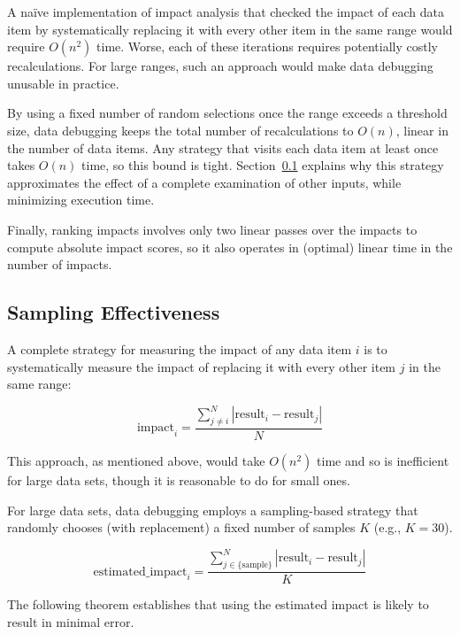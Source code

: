 A na\"ive implementation of impact analysis that checked the impact of
each data item by systematically replacing it with every other item in
the same range would require $O(n^2)$ time. Worse, each of these
iterations requires potentially costly recalculations. For large
ranges, such an approach would make data debugging unusable in
practice.
 
By using a fixed number of random selections once the range
exceeds a threshold size, data debugging keeps the total number of
recalculations to $O(n)$, linear in the number of data items. Any
strategy that visits each data item at least once takes $O(n)$ time,
so this bound is tight. Section~\ref{sec:sampling_effectiveness}
explains why this strategy approximates the effect of a complete
examination of other inputs, while minimizing execution time.

Finally, ranking impacts involves only two linear passes over the
impacts to compute absolute impact scores, so it also operates in
(optimal) linear time in the number of impacts.

\subsection{Sampling Effectiveness}
\label{sec:sampling_effectiveness}

A complete strategy for measuring the impact of any data item $i$ is to
systematically measure the impact of replacing it with every other
item $j$ in the same range:

\begin{equation}
\mbox{impact}_i = \frac{\sum_{j \neq i}^{N}{|\mbox{result}_i-\mbox{result}_j|}}{N}
\end{equation}

\noindent
This approach, as mentioned above, would take $O(n^2)$ time and so is
inefficient for large data sets, though it is reasonable to do for
small ones.

For large data sets, data debugging employs a sampling-based strategy
that randomly chooses (with replacement) a fixed number of samples $K$
(e.g., $K = 30$).

\begin{equation}
\mbox{estimated\_impact}_i = \frac{\sum_{j \in \{\mbox{sample}\}}^{N}{|\mbox{result}_i-\mbox{result}_j|}}{K}
\end{equation}

The following theorem establishes that using the estimated impact is
likely to result in minimal error.


